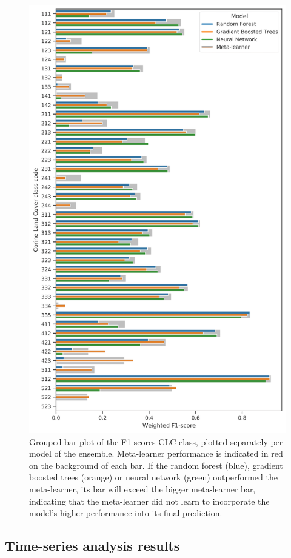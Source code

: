         \begin{figure}[!hp]
        \centering
        \includegraphics[width=0.9\linewidth]{figs_03/results_ensemble_comparison.png}
        \caption{Grouped bar plot of the F1-scores CLC class, plotted separately per model of the ensemble. Meta-learner performance is indicated in red on the background of each bar. If the random forest (blue), gradient boosted trees (orange) or neural network (green) outperformed the meta-learner, its bar will exceed the bigger meta-learner bar, indicating that the meta-learner did not learn to incorporate the model's higher performance into its final prediction.}
        \label{fig:ensemble_comparison}
        \end{figure}
    
\subsection*{Time-series analysis results}

